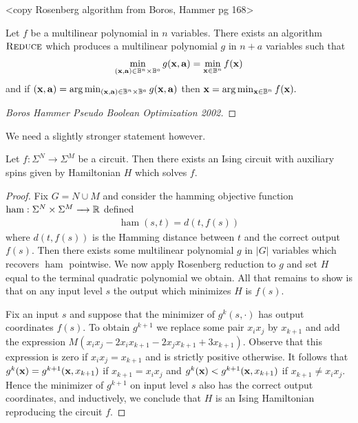 \documentclass{article}
\begin{document}
<copy Rosenberg algorithm from Boros, Hammer pg 168>

\begin{thm}\label{thm:rosenberg-reduction}
  Let $f$ be a multilinear polynomial in $n$ variables. There exists an algorithm $\textsc{Reduce}$ which produces a multilinear polynomial $g$ in $n + a$ variables such that
  \begin{align*}
    \min_{(\bfx, \bfa) \in \bB^n \times \bB^a} g(\bfx, \bfa) = \min_{\bfx \in \bB^n} f(\bfx)
  \end{align*}
  and if $(\bfx, \bfa) = \arg\min_{(\bfx, \bfa) \in \bB^n \times \bB^a} g(\bfx, \bfa)$ then $\bfx = \arg\min_{\bfx \in \bB^n} f(\bfx).$
\end{thm}
\begin{proof}
  [Boros Hammer Pseudo Boolean Optimization 2002]
\end{proof}
We need a slightly stronger statement however.
\begin{thm}
  Let $f:\Sigma^N \to \Sigma^M$ be a circuit. Then there exists an Ising circuit with auxiliary spins given by Hamiltonian $H$ which solves $f$.
\end{thm}
\begin{proof}
  Fix $G = N \cup M$ and consider the hamming objective function $\operatorname{ham}:\Sigma^N\times \Sigma^M\to \bR$ defined
  \begin{align*}
    \operatorname{ham}(s,t) = d(t, f(s))
  \end{align*}
  where $d(t, f(s))$ is the Hamming distance between $t$ and the correct output $f(s)$. Then there exists some multilinear polynomial $g$ in $|G|$ variables which recovers $\operatorname{ham}$ pointwise. We now apply Rosenberg reduction to $g$ and set $H$ equal to the terminal quadratic polynomial we obtain. All that remains to show is that on any input level $s$ the output which minimizes $H$ is $f(s)$.

  Fix an input $s$ and suppose that the minimizer of $g^k(s, \cdot)$ has output coordinates $f(s)$. To obtain $g^{k+1}$ we replace some pair $x_ix_j$ by $x_{k+1}$ and add the expression $M(x_ix_j - 2x_ix_{k+1} - 2x_jx_{k+1} + 3x_{k+1})$. Observe that this expression is zero if $x_ix_j = x_{k+1}$ and is strictly positive otherwise. It follows that $g^k(\mathbf{x}) = g^{k+1}(\mathbf{x}, x_{k+1})$ if $x_{k+1} = x_ix_j$ and $g^k(\mathbf{x}) < g^{k+1}(\mathbf{x}, x_{k+1})$ if $x_{k+1} \neq x_ix_j$. Hence the minimizer of $g^{k+1}$ on input level $s$ also has the correct output coordinates, and inductively, we conclude that $H$ is an Ising Hamiltonian reproducing the circuit $f$.
\end{proof}
\newpage


\end{document}
